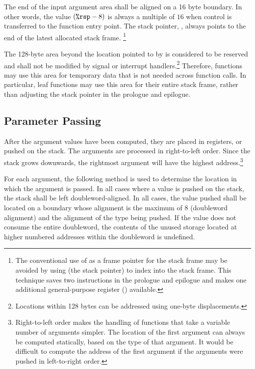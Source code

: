 The end of the input argument area shall be aligned on a 16 byte
boundary.  In other words, the value $({\texttt{\%rsp}} - 8)$ is always a multiple
of $16$ when control is transferred to the function entry point.  The
stack pointer, \RSP, always points to the end of the latest allocated
stack frame.  \footnote{The conventional use of \RBP{} as a frame
  pointer for the stack frame may be avoided by using \RSP (the stack
  pointer) to index into the stack frame.  This technique saves two
  instructions in the prologue and epilogue and makes one additional
  general-purpose register (\RBP) available.}

The 128-byte area beyond the location pointed to by \RSP is considered
to be reserved and shall not be modified by signal or interrupt
handlers.\footnote{Locations within 128 bytes can be addressed using
  one-byte displacements.}  Therefore, functions may use this area for
temporary data that is not needed across function calls.  In
particular, leaf functions may use this area for their entire stack
frame, rather than adjusting the stack pointer in the prologue and
epilogue.

\subsection{Parameter Passing}

After the argument values have been computed, they are placed in
registers, or pushed on the stack.  The arguments are processed in
right-to-left order.  Since the stack grows downwards, the rightmost
argument will have the highest address.\footnote{Right-to-left order
  makes the handling of functions that take a variable number of
  arguments simpler.  The location of the first argument can always be
  computed statically, based on the type of that argument.  It would
  be difficult to compute the address of the first argument if the
  arguments were pushed in left-to-right order.}

For each argument, the following method is used to determine the
location in which the argument is passed.  In all cases where a value
is pushed on the stack, the stack shall be left doubleword-aligned.
In all cases, the value pushed shall be located on a boundary whose
alignment is the maximum of 8 (doubleword alignment) and the alignment
of the type being pushed.  If the value does not consume the entire
doubleword, the contents of the unused storage located at higher
numbered addresses within the doubleword is undefined.

